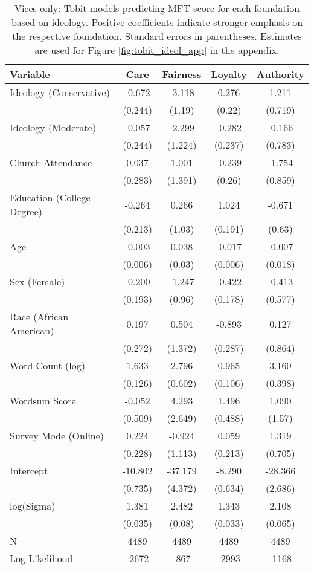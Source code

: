 \begin{table}[ht]
\centering
\caption{Vices only: Tobit models predicting MFT score for each foundation based 
           on ideology. Positive coefficients indicate stronger emphasis on the respective 
           foundation. Standard errors in parentheses. Estimates are used for 
           Figure \ref{fig:tobit_ideol_app} in the appendix.} 
\label{tab:tobit_vice}
\begingroup\footnotesize
\begin{tabular}{lcccc}
  \hline
Variable & Care & Fairness & Loyalty & Authority \\ 
  \hline
Ideology (Conservative) &  -0.672 &  -3.118 &  0.276 &   1.211 \\ 
   & (0.244) & (1.19) & (0.22) & (0.719) \\ 
  Ideology (Moderate) &  -0.057 &  -2.299 & -0.282 &  -0.166 \\ 
   & (0.244) & (1.224) & (0.237) & (0.783) \\ 
  Church Attendance &   0.037 &   1.001 & -0.239 &  -1.754 \\ 
   & (0.283) & (1.391) & (0.26) & (0.859) \\ 
  Education (College Degree) &  -0.264 &   0.266 &  1.024 &  -0.671 \\ 
   & (0.213) & (1.03) & (0.191) & (0.63) \\ 
  Age &  -0.003 &   0.038 & -0.017 &  -0.007 \\ 
   & (0.006) & (0.03) & (0.006) & (0.018) \\ 
  Sex (Female) &  -0.200 &  -1.247 & -0.422 &  -0.413 \\ 
   & (0.193) & (0.96) & (0.178) & (0.577) \\ 
  Race (African American) &   0.197 &   0.504 & -0.893 &   0.127 \\ 
   & (0.272) & (1.372) & (0.287) & (0.864) \\ 
  Word Count (log) &   1.633 &   2.796 &  0.965 &   3.160 \\ 
   & (0.126) & (0.602) & (0.106) & (0.398) \\ 
  Wordsum Score &  -0.052 &   4.293 &  1.496 &   1.090 \\ 
   & (0.509) & (2.649) & (0.488) & (1.57) \\ 
  Survey Mode (Online) &   0.224 &  -0.924 &  0.059 &   1.319 \\ 
   & (0.228) & (1.113) & (0.213) & (0.705) \\ 
  Intercept & -10.802 & -37.179 & -8.290 & -28.366 \\ 
   & (0.735) & (4.372) & (0.634) & (2.686) \\ 
  log(Sigma) &   1.381 &   2.482 &  1.343 &   2.108 \\ 
   & (0.035) & (0.08) & (0.033) & (0.065) \\ 
   \hline
N & 4489 & 4489 & 4489 & 4489 \\ 
  Log-Likelihood & -2672 & -867 & -2993 & -1168 \\ 
   \hline
\end{tabular}
\endgroup
\end{table}
